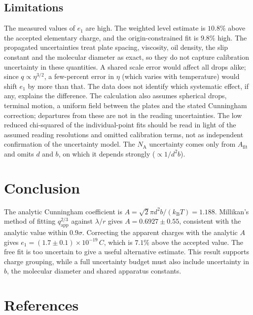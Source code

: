 \documentclass[12pt,a4paper]{article}
\begin{document}
\subsection{Limitations}
The measured values of $e_1$ are high. The weighted level estimate is
$10.8\%$ above the accepted elementary charge, and the origin-constrained fit
is $9.8\%$ high. The propagated uncertainties treat plate spacing,
viscosity, oil density, the slip constant and the molecular diameter as exact,
so they do not capture calibration uncertainty in these quantities. A shared
scale error would affect all drops alike; since $q\propto\eta^{3/2}$, a
few-percent error in $\eta$ (which varies with temperature) would shift $e_1$
by more than that. The data does not identify which systematic effect, if any,
explains the difference. The calculation also assumes spherical drops,
terminal motion, a uniform field between the plates and the stated
Cunningham correction; departures from these are not in the reading
uncertainties. The low reduced chi-squared of the individual-point fits
should be read in light of the assumed reading resolutions and omitted
calibration terms, not as independent confirmation of the uncertainty
model. The $N_{\mathrm{A}}$ uncertainty comes only from $A_{\mathrm{fit}}$ and
omits $d$ and $b$, on which it depends strongly ($\propto 1/d^2b$).

\newpage

\section{Conclusion}

The analytic Cunningham coefficient is $A=\sqrt{2}\pi d^2 b/(k_{\mathrm{B}}T)=1.188$.
Millikan's method of fitting $q_{\mathrm{app}}^{2/3}$ against $\lambda/r$ gives
$A=0.6927\pm0.55$, consistent with the analytic value within $0.9\sigma$.
Correcting the apparent charges with the analytic $A$ gives
$e_1=(1.7\pm0.1)\times10^{-19}\,\si{C}$, which is $7.1\%$ above the
accepted value. The free fit is too uncertain to give a useful alternative
estimate. This result supports charge grouping, while a full uncertainty
budget must also include uncertainty in $b$, the molecular diameter and shared
apparatus constants.



\newpage

\section{References}
\printbibliography
\end{document}
